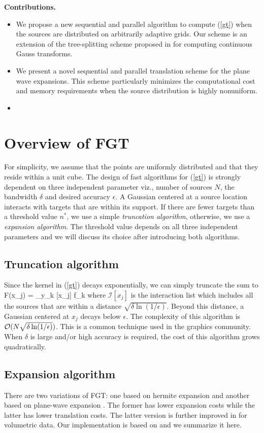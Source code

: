 \documentclass[conference]{IEEEtran}
\begin{document}
\textbf{Contributions.}
\begin{itemize} 
\item We propose a new sequential and parallel algorithm to compute (\ref{gt}) when the sources are distributed on arbitrarily adaptive grids. Our scheme is an extension of the tree-splitting scheme proposed in \cite{veerapaneni08} for computing continuous Gauss transforms. 
\item We present a novel sequential and parallel translation scheme for the plane wave expansions.
This scheme particularly minimizes the computational cost and memory requirements 
when the source distribution is highly nonuniform. 
\item 
\end{itemize}


\section{Overview of FGT}
For simplicity, we assume that the points are uniformly distributed and that they reside within a unit cube.
The design of fast algorithms for (\ref{gt}) is strongly dependent on three independent parameter viz., number of sources $N$, the bandwidth $\delta$ and desired accuracy $\epsilon$. A Gaussian centered at a source location interacts with targets that are within its support. If there are fewer targets than a threshold value $n^*$, we use a simple {\em truncation algorithm}, otherwise, we use a {\em expansion algorithm}. The threshold  value depends on all three independent parameters and we will discuss its choice after introducing both algorithms. 

\subsection{Truncation algorithm} 
Since the kernel in (\ref{gt}) decays exponentially, we can simply truncate the sum to
%
\beq F(x_j) = \sum_{y_k \in {}[x_j]}  f_k \eeq
%
where $\mathcal{I}[x_j]$ is the interaction list which includes all the sources that are within a distance $\sqrt{\delta \ln (1/\epsilon)}$. Beyond this distance, a Gaussian centered at $x_j$ decays below $\epsilon$. The complexity of this algorithm is $\mathcal{O}(N \sqrt{\delta \ln(1/\epsilon)})$. This is a common technique used in the graphics community. When $\delta$ is large and/or high accuracy is required, the cost of this algorithm grows quadratically.  

\subsection{Expansion algorithm}
There are two variations of FGT: one based on hermite expansion \cite{fgt} and another based on plane-wave expansion \cite{greengard98}. The former has lower expansion costs while the latter has lower translation costs. The latter version is further improved in \cite{fggt} for volumetric data. Our implementation is based on \cite{fggt} and we summarize it here. 
\end{document}

